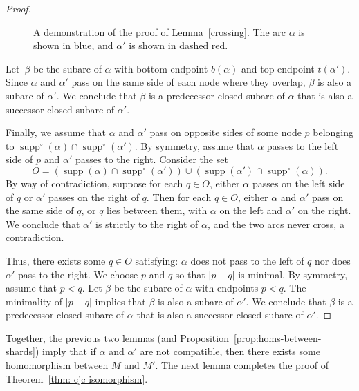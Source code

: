 \documentclass[ALCO,ThmDefs,Unicode,epreuves]{cedram}
\DeclareMathOperator{\supp}{supp}
\newcommand{\suppo}{\supp^{\circ}}
\renewcommand{\1}{\hat{1}}
\newcommand{\0}{\hat{0}}
\begin{document}
\begin{proof}
\begin{figure}[htb]
{
}

\caption{A demonstration of the proof of Lemma~\ref{crossing}.
The arc $\alpha$ is shown in blue, and $\alpha'$ is shown in dashed red.}
\label{fig: crossing}
\end{figure}

Let~$\beta$ be the subarc of $\alpha$ with bottom endpoint $b(\alpha)$ and top endpoint $t(\alpha')$.
Since $\alpha$ and $\alpha'$ pass on the same side of each node where they overlap, $\beta$ is also a subarc of $\alpha'$.
We conclude that $\beta$ is a predecessor closed subarc of $\alpha$ that is also a successor closed subarc of $\alpha'$.

Finally, we assume that $\alpha$ and $\alpha'$ pass on opposite sides
of some node $p$ belonging to
$\suppo(\alpha)\cap\suppo(\alpha')$. 
By symmetry, assume that $\alpha$ passes to the left side of $p$ and $\alpha'$ passes to the right.
Consider the set \[O=\left(\supp(\alpha)\cap\suppo(\alpha')\right)\cup \left(\supp(\alpha')\cap \suppo(\alpha)\right).\]
By way of contradiction, suppose for each $q\in O$, either $\alpha$ passes on the left side of $q$ or $\alpha'$ passes on the right of $q$.
Then for each $q\in O$, either $\alpha$ and $\alpha'$ pass on the same side of $q$, or $q$ lies between them, with $\alpha$ on the left and $\alpha'$ on the right.
We conclude that $\alpha'$ is strictly to the right of $\alpha$, and
the two arcs never cross, a contradiction.

Thus, there exists some $q\in O$ satisfying: $\alpha$ does not pass to
the left of $q$ nor does $\alpha'$ pass to the right. 
We choose $p$ and $q$ so that $|p-q|$ is minimal.
By symmetry, assume that $p<q$.
Let $\beta$ be the subarc of $\alpha$ with endpoints $p<q$.
The minimality of $|p-q|$ implies that $\beta$ is also a subarc of $\alpha'$.
We conclude that $\beta$ is a predecessor closed subarc of $\alpha$ that is also a successor closed subarc of $\alpha'$.
\end{proof}
Together, the previous two lemmas (and Proposition~\ref{prop:homs-between-shards}) imply that if $\alpha$ and $\alpha'$ are not compatible, then there exists some homomorphism between $M$ and $M'$.
The next lemma completes the proof of Theorem~\ref{thm: cjc isomorphism}.
\end{document}
